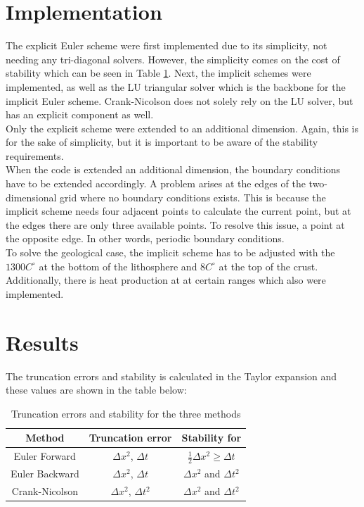 \documentclass[10pt,a4paper]{article}
\begin{document}
\section*{Implementation}

\noindent The explicit Euler scheme were first implemented due to its simplicity, not needing any tri-diagonal solvers. However, the simplicity comes on the cost of stability which can be seen in Table \ref{truncstab}. Next, the implicit schemes were implemented, as well as the LU triangular solver which is the backbone for the implicit Euler scheme. Crank-Nicolson does not solely rely on the LU solver, but has an explicit component as well.\\

\noindent Only the explicit scheme were extended to an additional dimension. Again, this is for the sake of simplicity, but it is important to be aware of the stability requirements. \\

\noindent When the code is extended an additional dimension, the boundary conditions have to be extended accordingly. A problem arises at the edges of the two-dimensional grid where no boundary conditions exists. This is because the implicit scheme needs four adjacent points to calculate the current point, but at the edges there are only three available points. To resolve this issue, a point at the opposite edge. In other words, periodic boundary conditions. \\


\noindent To solve the geological case, the implicit scheme has to be adjusted with the $1300 C^{\circ}$ at the bottom of the lithosphere and $8 C^{\circ}$ at the top of the crust. Additionally, there is heat production at at certain ranges which also were implemented.



\newpage
\section*{Results}


\noindent The truncation errors and stability is calculated in the Taylor expansion and these values are shown in the table below:


\begin{table}[H]
\centering
\caption{Truncation errors and stability for the three methods}
\begin{tabular}{|c|c|c|}
\hline
Method & Truncation error & Stability for\\
\hline
Euler Forward & $\Delta x^2$, $\Delta t$ & $\frac{1}{2} \Delta x^2 \geq \Delta t$\\
\hline
Euler Backward & $\Delta x^2$, $\Delta t$ & $\Delta x^2$ and $\Delta t^2$\\
\hline
Crank-Nicolson & $\Delta x^2$, $\Delta t^2$ & $\Delta x^2$ and $\Delta t^2$\\
\hline
\end{tabular}
\label{truncstab}
\end{table}
 
\end{document}
